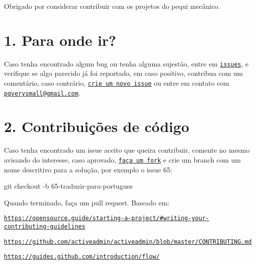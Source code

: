 Obrigado por considerar contribuir com os projetos do pequi mecânico.

\section*{1. Para onde ir?}

Caso tenha encontrado algum bug ou tenha alguma sujestão, entre em \href{https://github.com/PEQUI-VSSS/VSSS-EMC/issues}{\tt issues}, e verifique se algo parecido já foi reportado, em caso positivo, contribua com um comentário, caso contrário, \href{https://github.com/PEQUI-VSSS/VSSS-EMC/issues/new}{\tt crie um novo issue} ou entre em contato com \href{mailto:pqverysmall@gmail.com}{\tt pqverysmall@gmail.\+com}.

\section*{2. Contribuições de código}

Caso tenha encontrado um issue aceito que queira contribuir, comente no mesmo avisando do interesse, caso aprovado, \href{https://help.github.com/articles/fork-a-repo}{\tt faça um fork} e crie um branch com um nome descritivo para a solução, por exemplo o issue 65\+:


\begin{DoxyCode}
git checkout -b 65-traduzir-para-portugues
\end{DoxyCode}


Quando terminado, faça um pull request. Baseado em\+:
\begin{DoxyItemize}
\item \href{https://opensource.guide/starting-a-project/#writing-your-contributing-guidelines}{\tt https\+://opensource.\+guide/starting-\/a-\/project/\#writing-\/your-\/contributing-\/guidelines}
\item \href{https://github.com/activeadmin/activeadmin/blob/master/CONTRIBUTING.md}{\tt https\+://github.\+com/activeadmin/activeadmin/blob/master/\+C\+O\+N\+T\+R\+I\+B\+U\+T\+I\+N\+G.\+md}
\item \href{https://guides.github.com/introduction/flow/}{\tt https\+://guides.\+github.\+com/introduction/flow/} 
\end{DoxyItemize}